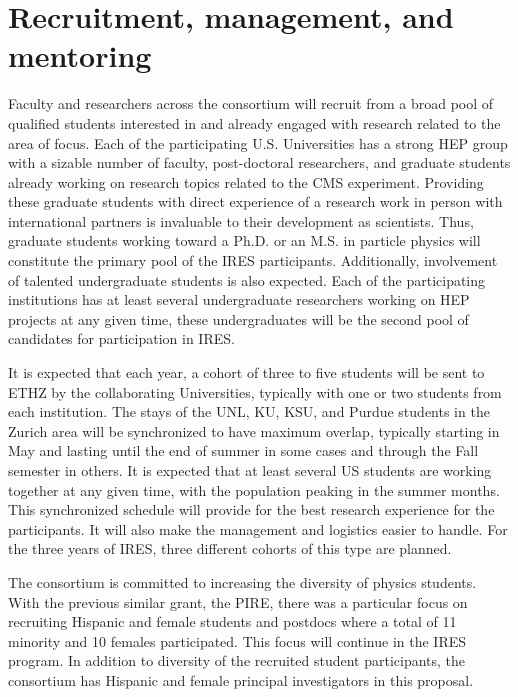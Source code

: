 
\section{Recruitment, management, and mentoring}

%
Faculty and researchers across the consortium will recruit from a
broad pool of qualified students interested in and already engaged
with research related to the area of focus. Each of the participating
U.S. Universities has a strong HEP group with a sizable number of
faculty, post-doctoral researchers, and graduate students already
working on research topics related to the CMS experiment. Providing
these graduate students with direct experience of a research work in
person with international partners is invaluable to their development
as scientists. Thus, graduate students working toward a Ph.D. or an
M.S. in particle physics will constitute the primary pool of the IRES
participants. Additionally, involvement of talented undergraduate
students is also expected. Each of the participating institutions has
at least several undergraduate researchers working on HEP projects at
any given time, these undergraduates will be the second pool of
candidates for participation in IRES.

It is expected that each year, a cohort of three to five students will
be sent to ETHZ by the collaborating Universities, typically with one
or two students from each institution. The stays of the UNL, KU, KSU,
and Purdue students in the Zurich area will be synchronized to have
maximum overlap, typically starting in May and lasting until the end
of summer in some cases and through the Fall semester in others. It is
expected that at least several US students are working together at any
given time, with the population peaking in the summer months. This
synchronized schedule will provide for the best research experience
for the participants. It will also make the management and logistics
easier to handle. For the three years of IRES, three different cohorts
of this type are planned.

%
The consortium is committed to increasing the diversity of physics
students.  
With the previous similar grant, the PIRE, there was a particular
focus on recruiting Hispanic and female students and postdocs where a
total of 11 minority and 10 females participated. 
This focus will continue in the IRES program. In addition to diversity of
the recruited student participants, the consortium has Hispanic and
female principal investigators in this proposal.

